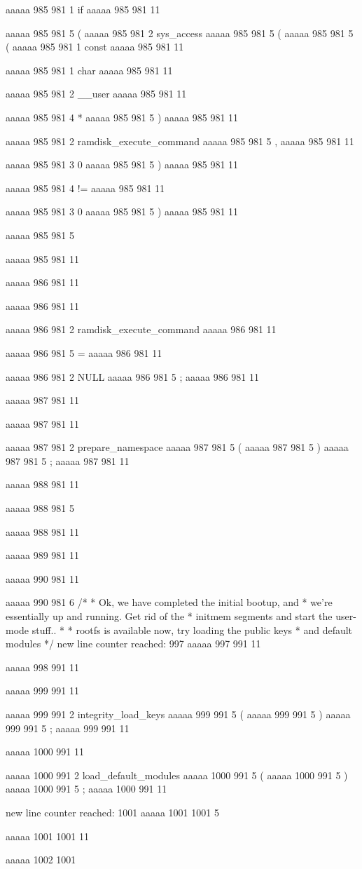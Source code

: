 {aaaaa 985 981
1
if
aaaaa 985 981
11
 
aaaaa 985 981
5
(
aaaaa 985 981
2
sys_access
aaaaa 985 981
5
(
aaaaa 985 981
5
(
aaaaa 985 981
1
const
aaaaa 985 981
11
 
aaaaa 985 981
1
char
aaaaa 985 981
11
 
aaaaa 985 981
2
__user
aaaaa 985 981
11
 
aaaaa 985 981
4
*
aaaaa 985 981
5
)
aaaaa 985 981
11
 
aaaaa 985 981
2
ramdisk_execute_command
aaaaa 985 981
5
,
aaaaa 985 981
11
 
aaaaa 985 981
3
0
aaaaa 985 981
5
)
aaaaa 985 981
11
 
aaaaa 985 981
4
!=
aaaaa 985 981
11
 
aaaaa 985 981
3
0
aaaaa 985 981
5
)
aaaaa 985 981
11
 
aaaaa 985 981
5
{
aaaaa 985 981
11


aaaaa 986 981
11
	
aaaaa 986 981
11
	
aaaaa 986 981
2
ramdisk_execute_command
aaaaa 986 981
11
 
aaaaa 986 981
5
=
aaaaa 986 981
11
 
aaaaa 986 981
2
NULL
aaaaa 986 981
5
;
aaaaa 986 981
11


aaaaa 987 981
11
	
aaaaa 987 981
11
	
aaaaa 987 981
2
prepare_namespace
aaaaa 987 981
5
(
aaaaa 987 981
5
)
aaaaa 987 981
5
;
aaaaa 987 981
11


aaaaa 988 981
11
	
aaaaa 988 981
5
}
aaaaa 988 981
11


aaaaa 989 981
11


aaaaa 990 981
11
	
aaaaa 990 981
6
/*
	 * Ok, we have completed the initial bootup, and
	 * we're essentially up and running. Get rid of the
	 * initmem segments and start the user-mode stuff..
	 *
	 * rootfs is available now, try loading the public keys
	 * and default modules
	 */
new line counter reached: 997
aaaaa 997 991
11


aaaaa 998 991
11


aaaaa 999 991
11
	
aaaaa 999 991
2
integrity_load_keys
aaaaa 999 991
5
(
aaaaa 999 991
5
)
aaaaa 999 991
5
;
aaaaa 999 991
11


aaaaa 1000 991
11
	
aaaaa 1000 991
2
load_default_modules
aaaaa 1000 991
5
(
aaaaa 1000 991
5
)
aaaaa 1000 991
5
;
aaaaa 1000 991
11


new line counter reached: 1001
aaaaa 1001 1001
5
}
aaaaa 1001 1001
11


aaaaa 1002 1001

